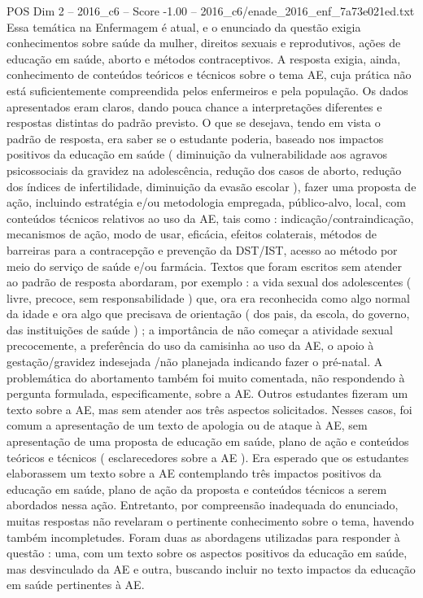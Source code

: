 \begin{textsample}{POS Dim 2 – 2016\_c6 – Score -1.00 – 2016\_c6/enade\_2016\_enf\_7a73e021ed.txt}
Essa temática na Enfermagem é atual, e o enunciado da questão exigia conhecimentos sobre saúde da mulher, direitos sexuais e reprodutivos, ações de educação em saúde, aborto e métodos contraceptivos.
A resposta exigia, ainda, conhecimento de conteúdos teóricos e técnicos sobre o tema AE, cuja prática não está suficientemente compreendida pelos enfermeiros e pela população.
Os dados apresentados eram claros, dando pouca chance a interpretações diferentes e respostas distintas do padrão previsto.
O que se desejava, tendo em vista o padrão de resposta, era saber se o estudante poderia, baseado nos impactos positivos da educação em saúde ( diminuição da vulnerabilidade aos agravos psicossociais da gravidez na adolescência, redução dos casos de aborto, redução dos índices de infertilidade, diminuição da evasão escolar ), fazer uma proposta de ação, incluindo estratégia e/ou metodologia empregada, público-alvo, local, com conteúdos técnicos relativos ao uso da AE, tais como : indicação/contraindicação, mecanismos de ação, modo de usar, eficácia, efeitos colaterais, métodos de barreiras para a contracepção e prevenção da DST/IST, acesso ao método por meio do serviço de saúde e/ou farmácia.
Textos que foram escritos sem atender ao padrão de resposta abordaram, por exemplo : a vida sexual dos adolescentes ( livre, precoce, sem responsabilidade ) que, ora era reconhecida como algo normal da idade e ora algo que precisava de orientação ( dos pais, da escola, do governo, das instituições de saúde ) ; a importância de não começar a atividade sexual precocemente, a preferência do uso da camisinha ao uso da AE, o apoio à gestação/gravidez indesejada /não planejada indicando fazer o pré-natal.
A problemática do abortamento também foi muito comentada, não respondendo à pergunta formulada, especificamente, sobre a AE.
Outros estudantes fizeram um texto sobre a AE, mas sem atender aos três aspectos solicitados.
Nesses casos, foi comum a apresentação de um texto de apologia ou de ataque à AE, sem apresentação de uma proposta de educação em saúde, plano de ação e conteúdos teóricos e técnicos ( esclarecedores sobre a AE ).
Era esperado que os estudantes elaborassem um texto sobre a AE contemplando três impactos positivos da educação em saúde, plano de ação da proposta e conteúdos técnicos a serem abordados nessa ação.
Entretanto, por compreensão inadequada do enunciado, muitas respostas não revelaram o pertinente conhecimento sobre o tema, havendo também incompletudes.
Foram duas as abordagens utilizadas para responder à questão : uma, com um texto sobre os aspectos positivos da educação em saúde, mas desvinculado da AE e outra, buscando incluir no texto impactos da educação em saúde pertinentes à AE.

\end{textsample}
